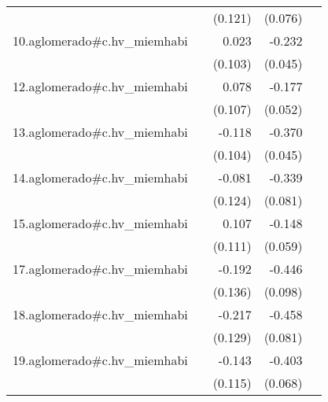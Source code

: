 {\begin{longtable}{l*{4}{D{.}{.}{-1}}}
            &                     &     (0.121)         &     (0.076)         &                     \\
\addlinespace
10.aglomerado#c.hv\_miemhabi&                     &       0.023         &      -0.232\sym{***}&                     \\
            &                     &     (0.103)         &     (0.045)         &                     \\
\addlinespace
12.aglomerado#c.hv\_miemhabi&                     &       0.078         &      -0.177\sym{***}&                     \\
            &                     &     (0.107)         &     (0.052)         &                     \\
\addlinespace
13.aglomerado#c.hv\_miemhabi&                     &      -0.118         &      -0.370\sym{***}&                     \\
            &                     &     (0.104)         &     (0.045)         &                     \\
\addlinespace
14.aglomerado#c.hv\_miemhabi&                     &      -0.081         &      -0.339\sym{***}&                     \\
            &                     &     (0.124)         &     (0.081)         &                     \\
\addlinespace
15.aglomerado#c.hv\_miemhabi&                     &       0.107         &      -0.148\sym{*}  &                     \\
            &                     &     (0.111)         &     (0.059)         &                     \\
\addlinespace
17.aglomerado#c.hv\_miemhabi&                     &      -0.192         &      -0.446\sym{***}&                     \\
            &                     &     (0.136)         &     (0.098)         &                     \\
\addlinespace
18.aglomerado#c.hv\_miemhabi&                     &      -0.217         &      -0.458\sym{***}&                     \\
            &                     &     (0.129)         &     (0.081)         &                     \\
\addlinespace
19.aglomerado#c.hv\_miemhabi&                     &      -0.143         &      -0.403\sym{***}&                     \\
            &                     &     (0.115)         &     (0.068)         &                     \\

\end{longtable}}
